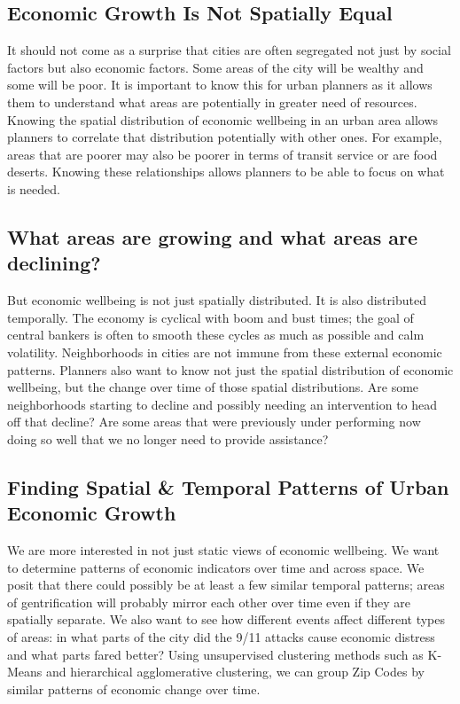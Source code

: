 \documentclass[letter, 11pt]{article} %
\begin{document}
	\subsection{Economic Growth Is Not Spatially Equal}
	It should not come as a surprise that cities are often segregated not just by social factors but also economic factors. Some areas of the city will be wealthy and some will be poor. It is important to know this for urban planners as it allows them to understand what areas are potentially in greater need of resources. Knowing the spatial distribution of economic wellbeing in an urban area allows planners to correlate that distribution potentially with other ones. For example, areas that are poorer may also be poorer in terms of transit service or are food deserts. Knowing these relationships allows planners to be able to focus on what is needed.

	\subsection{What areas are growing and what areas are declining?}
	But economic wellbeing is not just spatially distributed. It is also distributed temporally. The economy is cyclical with boom and bust times; the goal of central bankers is often to smooth these cycles as much as possible and calm volatility. Neighborhoods in cities are not immune from these external economic patterns. Planners also want to know not just the spatial distribution of economic wellbeing, but the change over time of those spatial distributions. Are some neighborhoods starting to decline and possibly needing an intervention to head off that decline? Are some areas that were previously under performing now doing so well that we no longer need to provide assistance?

	
	\subsection{Finding Spatial \& Temporal Patterns of Urban Economic Growth}
	We are more interested in not just static views of economic wellbeing. We want to determine patterns of economic indicators over time and across space. We posit that there could possibly be at least a few similar temporal patterns; areas of gentrification will probably mirror each other over time even if they are spatially separate. We also want to see how different events affect different types of areas: in what parts of the city did the 9/11 attacks cause economic distress and what parts fared better? Using unsupervised clustering methods such as K-Means and hierarchical agglomerative clustering, we can group Zip Codes by similar patterns of economic change over time. 
	
\end{document}
